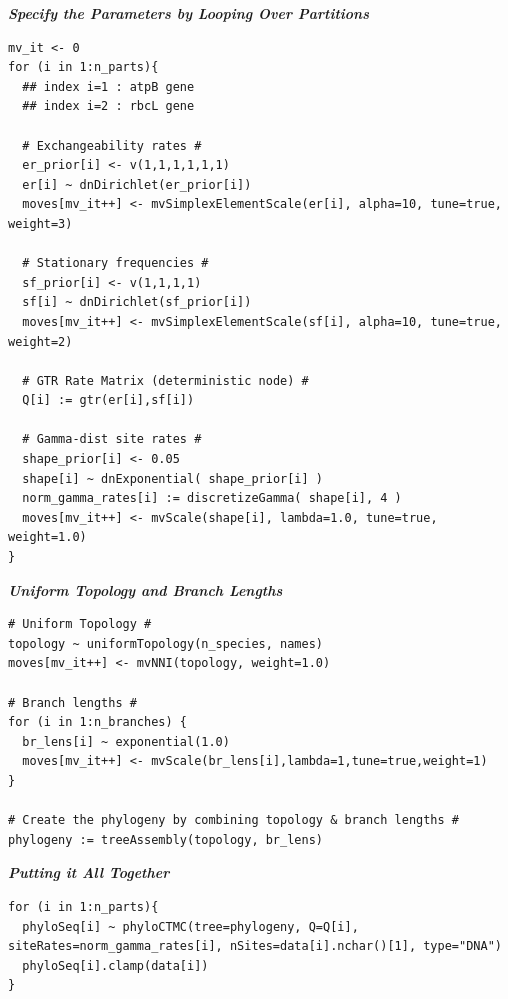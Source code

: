 \documentclass[11pt]{article}
\begin{document}
\textbf{\textit{Specify the Parameters by Looping Over Partitions}}


{\tt \small \begin{snugshade*}
\begin{lstlisting}
mv_it <- 0
for (i in 1:n_parts){
  ## index i=1 : atpB gene
  ## index i=2 : rbcL gene

  # Exchangeability rates #
  er_prior[i] <- v(1,1,1,1,1,1)
  er[i] ~ dnDirichlet(er_prior[i])
  moves[mv_it++] <- mvSimplexElementScale(er[i], alpha=10, tune=true, weight=3) 

  # Stationary frequencies #
  sf_prior[i] <- v(1,1,1,1)
  sf[i] ~ dnDirichlet(sf_prior[i])
  moves[mv_it++] <- mvSimplexElementScale(sf[i], alpha=10, tune=true, weight=2) 

  # GTR Rate Matrix (deterministic node) #
  Q[i] := gtr(er[i],sf[i]) 

  # Gamma-dist site rates #
  shape_prior[i] <- 0.05 
  shape[i] ~ dnExponential( shape_prior[i] )
  norm_gamma_rates[i] := discretizeGamma( shape[i], 4 )
  moves[mv_it++] <- mvScale(shape[i], lambda=1.0, tune=true, weight=1.0)
}
\end{lstlisting}
\end{snugshade*}}


\textbf{\textit{Uniform Topology and Branch Lengths}}

{\tt \begin{snugshade*}
\begin{lstlisting}
# Uniform Topology #
topology ~ uniformTopology(n_species, names)
moves[mv_it++] <- mvNNI(topology, weight=1.0)

# Branch lengths #
for (i in 1:n_branches) {
  br_lens[i] ~ exponential(1.0)
  moves[mv_it++] <- mvScale(br_lens[i],lambda=1,tune=true,weight=1) 
}

# Create the phylogeny by combining topology & branch lengths #
phylogeny := treeAssembly(topology, br_lens)
\end{lstlisting}
\end{snugshade*}}

\textbf{\textit{Putting it All Together}}

{\tt \begin{snugshade*}
\begin{lstlisting}
for (i in 1:n_parts){
  phyloSeq[i] ~ phyloCTMC(tree=phylogeny, Q=Q[i], siteRates=norm_gamma_rates[i], nSites=data[i].nchar()[1], type="DNA")
  phyloSeq[i].clamp(data[i])
}
\end{lstlisting}
\end{snugshade*}}
\end{document}
